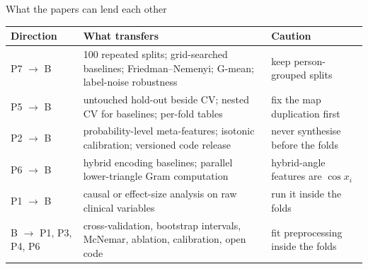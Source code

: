 \documentclass[aspectratio=169,10pt,t,xcolor={table}]{beamer}
\begin{document}
\begin{frame}{What the papers can lend each other}
\centering\scriptsize
\begin{tabularx}{\textwidth}{L{2.6cm} Y L{4.2cm}}
\toprule
Direction & What transfers & Caution \\
\midrule
P7 $\to$ B & 100 repeated splits; grid-searched baselines; Friedman--Nemenyi; G-mean; label-noise robustness & keep person-grouped splits \\
P5 $\to$ B & untouched hold-out beside CV; nested CV for baselines; per-fold tables & fix the map duplication first \\
P2 $\to$ B & probability-level meta-features; isotonic calibration; versioned code release & never synthesise before the folds \\
P6 $\to$ B & hybrid encoding baselines; parallel lower-triangle Gram computation & hybrid-angle features are $\cos x_i$ \\
P1 $\to$ B & causal or effect-size analysis on raw clinical variables & run it inside the folds \\
B $\to$ P1, P3, P4, P6 & cross-validation, bootstrap intervals, McNemar, ablation, calibration, open code & fit preprocessing inside the folds \\
\bottomrule
\end{tabularx}
\end{frame}

\end{document}
